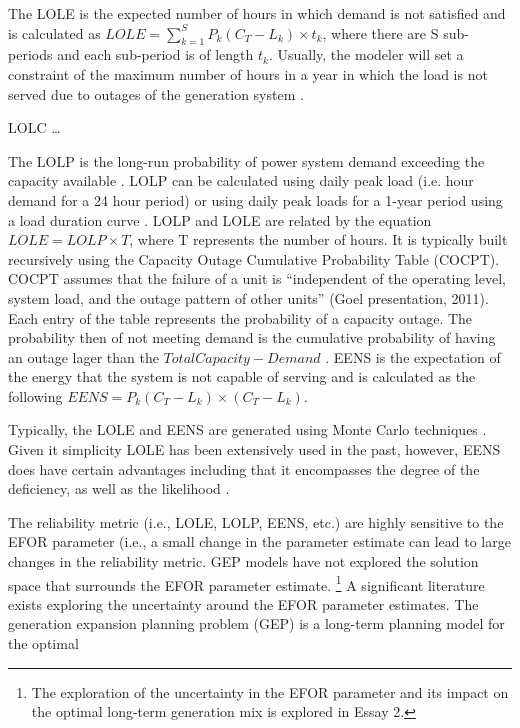 \documentclass[10pt]{amsart}
\begin{document}
The LOLE is the expected number of hours in which demand is not satisfied and is calculated as $LOLE = \sum_{k=1}^S P_k\left(C_T - L_k \right)\times t_k$, where there are S sub-periods and each sub-period is of length $t_k$.
Usually, the modeler will set a constraint of the maximum number of hours in a year in which the load is not served due to outages of the generation system \parencite{phoon:2006}.

LOLC \ldots

The LOLP is the long-run probability of power system demand exceeding the capacity available \parencite{endrenyi:1978}.  
LOLP can be calculated using daily peak load (i.e. hour demand for a 24 hour period) or using daily peak loads for a 1-year period using a load duration curve \parencite{endrenyi:1978}.
LOLP and LOLE are related by the equation $LOLE = LOLP \times T$, where T represents the number of hours.   
It is typically built recursively using the Capacity Outage Cumulative Probability Table (COCPT). 
COCPT assumes that the failure of a unit is ``independent of the operating level, system load, and the outage pattern of other units'' (Goel presentation, 2011). 
Each entry of the table represents the probability of a capacity outage.
The probability then of not meeting demand is the cumulative probability of having an outage lager than the $Total Capacity - Demand$ \parencite[p78]{pereira2010decision}.
EENS is the expectation of the energy that the system is not capable of serving and is calculated as the following $EENS = P_k \left(C_T - L_k \right)\times \left(C_T- L_k \right)$. 

Typically, the LOLE and EENS are generated using Monte Carlo techniques \parencite{billinton1996reliability, li2012uncertainty}.
Given it simplicity LOLE has been extensively used in the past, however, EENS does have certain advantages including that it encompasses the degree of the deficiency, as well as the likelihood \parencite[p622]{murugan2009nsga}. 
	

	The reliability metric (i.e., LOLE, LOLP, EENS, etc.) are highly sensitive to the EFOR parameter (i.e., a small change in the parameter estimate can lead to large changes in the reliability metric. 
	GEP models have not explored the solution space that surrounds the EFOR parameter estimate. \footnote{The exploration of the uncertainty in the EFOR parameter and its impact on the optimal long-term generation mix is explored in Essay 2.}
	A significant literature exists exploring the uncertainty around the EFOR parameter estimates.
The generation expansion planning problem (GEP) is a long-term planning model for the optimal 
\end{document}
